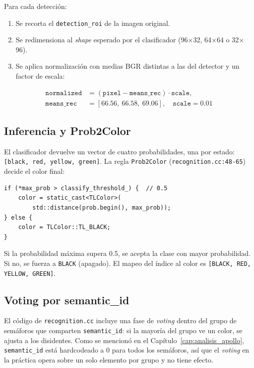 Para cada detección:

\begin{enumerate}
    \item Se recorta el \texttt{detection\_roi} de la imagen original.
    \item Se redimensiona al \textit{shape} esperado por el clasificador (96$\times$32, 64$\times$64 o 32$\times$96).
    \item Se aplica normalización con medias BGR distintas a las del detector y un factor de escala:
\end{enumerate}

\begin{align*}
\texttt{normalized} &= (\texttt{pixel} - \texttt{means\_rec}) \cdot \texttt{scale}, \\
\texttt{means\_rec} &= [66.56,\ 66.58,\ 69.06], \quad \texttt{scale} = 0.01
\end{align*}

\subsection{Inferencia y Prob2Color}

El clasificador devuelve un vector de cuatro probabilidades, una por estado: \texttt{[black, red, yellow, green]}. La regla \texttt{Prob2Color} (\texttt{recognition.cc:48-65}) decide el color final:

\begin{codesnippet}
\begin{verbatim}
if (*max_prob > classify_threshold_) {  // 0.5
    color = static_cast<TLColor>(
        std::distance(prob.begin(), max_prob));
} else {
    color = TLColor::TL_BLACK;
}
\end{verbatim}
\end{codesnippet}

Si la probabilidad máxima supera 0.5, se acepta la clase con mayor probabilidad. Si no, se fuerza a \texttt{BLACK} (apagado). El mapeo del índice al color es \texttt{[BLACK, RED, YELLOW, GREEN]}.

\subsection{Voting por semantic\_id}

El código de \texttt{recognition.cc} incluye una fase de \textit{voting} dentro del grupo de semáforos que comparten \texttt{semantic\_id}: si la mayoría del grupo ve un color, se ajusta a los disidentes. Como se mencionó en el Capítulo~\ref{cap:analisis_apollo}, \texttt{semantic\_id} está hardcodeado a 0 para todos los semáforos, así que el \textit{voting} en la práctica opera sobre un solo elemento por grupo y no tiene efecto.

